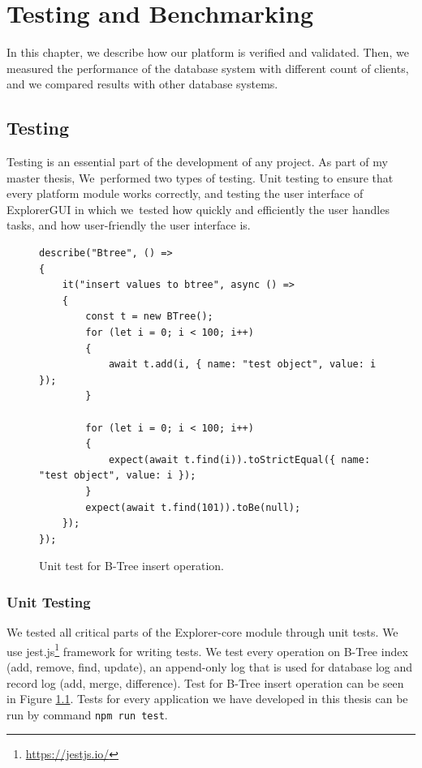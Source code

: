 \chapter{Testing and Benchmarking}
In this chapter, we describe how our platform is verified and validated. Then, we measured the performance of the database system with different count of clients, and we compared results with other database systems. 


\section{Testing}
Testing is an essential part of the development of any project. As part of my master thesis, We~performed two types of testing. Unit testing to ensure that every platform module works correctly, and testing the user interface of ExplorerGUI in which we~tested how quickly and efficiently the user handles tasks, and how user-friendly the user interface is.

\begin{figure}[h]
    \centering
    \begin{lstlisting}[style=ES6]
describe("Btree", () =>
{
    it("insert values to btree", async () =>
    {
        const t = new BTree();
        for (let i = 0; i < 100; i++)
        {
            await t.add(i, { name: "test object", value: i });
        }

        for (let i = 0; i < 100; i++)
        {
            expect(await t.find(i)).toStrictEqual({ name: "test object", value: i });
        }
        expect(await t.find(101)).toBe(null);
    });
});
    \end{lstlisting}
    \caption{Unit test for B-Tree insert operation.}
    \label{unitTest}
\end{figure}

\subsection{Unit Testing}
We tested all critical parts of the Explorer-core module through unit tests. We use jest.js\footnote{\url{https://jestjs.io/}} framework for writing tests. We test every operation on B-Tree index (add, remove, find, update), an append-only log that is used for database log and record log (add, merge, difference). Test for B-Tree insert operation can be seen in Figure \ref{unitTest}. Tests for every application we have developed in this thesis can be run by command \texttt{npm run test}.






